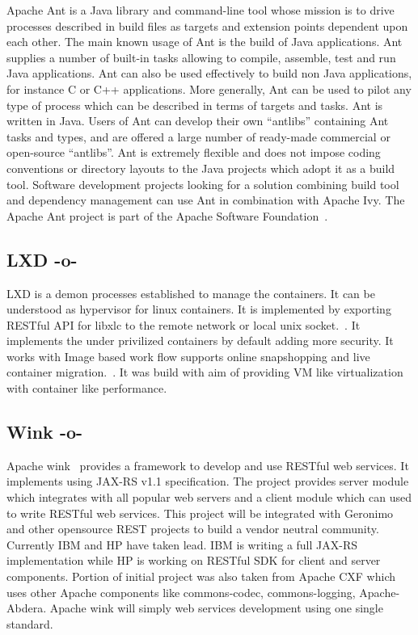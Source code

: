 Apache Ant is a Java library and command-line tool whose mission is to
drive processes described in build files as targets and extension
points dependent upon each other. The main known usage of Ant is the
build of Java applications. Ant supplies a number of built-in tasks
allowing to compile, assemble, test and run Java applications. Ant can
also be used effectively to build non Java applications, for instance
C or C++ applications. More generally, Ant can be used to pilot any
type of process which can be described in terms of targets and
tasks. Ant is written in Java. Users of Ant can develop their own
``antlibs'' containing Ant tasks and types, and are offered a large
number of ready-made commercial or open-source ``antlibs''. Ant is
extremely flexible and does not impose coding conventions or directory
layouts to the Java projects which adopt it as a build tool. Software
development projects looking for a solution combining build tool and
dependency management can use Ant in combination with Apache Ivy. The
Apache Ant project is part of the Apache Software
Foundation~\cite{ant-www}.

\subsection{LXD -o-}

LXD is a demon processes established to manage the containers. It can
be understood as hypervisor for linux containers. It is implemented by
exporting RESTful API for libxlc to the remote network or local unix
socket.~\cite{www-lxd-thevarguy}. It implements the under privilized
containers by default adding more security. It works with Image based
work flow supports online snapshopping and live container
migration.~\cite{www-lxd-lists-linux}. It was build with aim of
providing VM like virtualization with container like
performance.~\cite{www-lxd-ubuntu}

\subsection{Wink -o-}

Apache wink~\cite{www-apache-wink} provides a framework to develop and
use RESTful web services. It implements using JAX-RS v1.1
specification. The project provides server module which integrates
with all popular web servers and a client module which can used to
write RESTful web services. This project will be integrated with
Geronimo and other opensource REST projects to build a vendor neutral
community. Currently IBM and HP have taken lead. IBM is writing a full
JAX-RS implementation while HP is working on RESTful SDK for client
and server components.  Portion of initial project was also taken from
Apache CXF which uses other Apache components like commons-codec,
commons-logging, Apache-Abdera. Apache wink will simply web services
development using one single standard.

